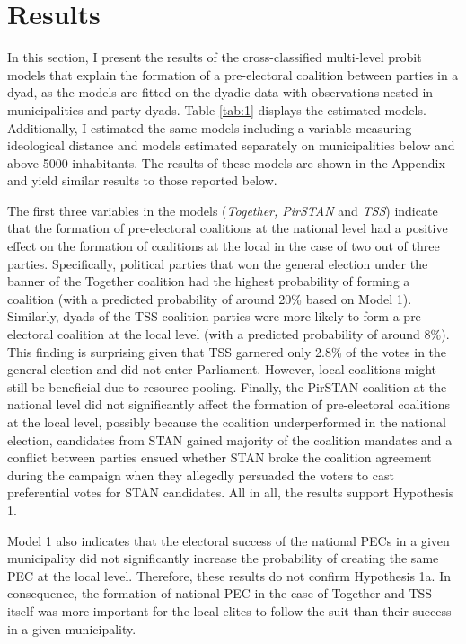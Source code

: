 \documentclass[]{interact}
\theoremstyle{plain}%
\theoremstyle{definition}
\theoremstyle{remark}
\begin{document}
\section{Results}

In this section, I present the results of the cross-classified multi-level probit models that explain the formation of a pre-electoral coalition between parties in a dyad, as the models are fitted on the dyadic data with observations nested in municipalities and party dyads. Table \ref{tab:1} displays the estimated models. Additionally, I estimated the same models including a variable measuring ideological distance and models estimated separately on municipalities below and above 5000 inhabitants. The results of these models are shown in the Appendix and yield similar results to those reported below.

The first three variables in the models (\emph{Together, PirSTAN} and \emph{TSS}) indicate that the formation of pre-electoral coalitions at the national level had a positive effect on the formation of coalitions at the local in the case of two out of three parties. Specifically, political parties that won the general election under the banner of the Together coalition had the highest probability of forming a coalition (with a predicted probability of around 20\% based on Model 1). Similarly, dyads of the TSS coalition parties were more likely to form a pre-electoral coalition at the local level (with a predicted probability of around 8\%). This finding is surprising given that TSS garnered only 2.8\% of the votes in the general election and did not enter Parliament. However, local coalitions might still be beneficial due to resource pooling. Finally, the PirSTAN coalition at the national level did not significantly affect the formation of pre-electoral coalitions at the local level, possibly because the coalition underperformed in the national election, candidates from STAN gained majority of the coalition mandates and a conflict between parties ensued whether STAN broke the coalition agreement during the campaign when they allegedly persuaded the voters to cast preferential votes for STAN candidates. All in all, the results support Hypothesis 1.

Model 1 also indicates that the electoral success of the national PECs in a given municipality did not significantly increase the probability of creating the same PEC at the local level. Therefore, these results do not confirm Hypothesis 1a. In consequence, the formation of national PEC in the case of Together and TSS itself was more important for the local elites to follow the suit than their success in a given municipality. 
\end{document}
